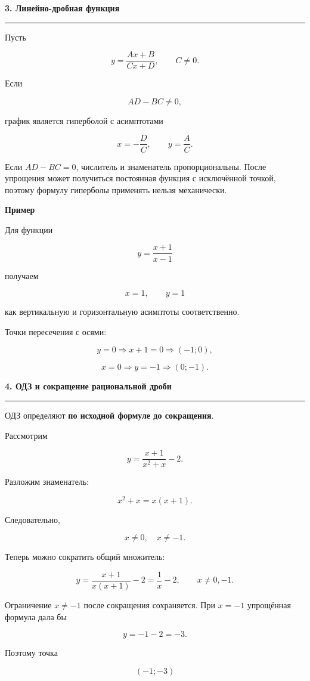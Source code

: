 \documentclass[a4paper,12pt]{article}
\newcommand{\sectiontitle}[1]{%
    \par\vspace{0.65em}
    {\Large\bfseries\color{darkaccent}#1}\par
    \vspace{0.15em}
    {\color{accent}\rule{\linewidth}{0.65pt}}\par
    \vspace{0.3em}
}
\newcommand{\subsectiontitle}[1]{%
    \par\vspace{0.45em}
    {\large\bfseries\color{darkaccent}#1}\par
    \vspace{0.1em}
}
\begin{document}
\sectiontitle{3. Линейно-дробная функция}

Пусть

\[
y=\frac{Ax+B}{Cx+D},
\qquad C\ne0.
\]

Если

\[
AD-BC\ne0,
\]

график является гиперболой с асимптотами

\[
\boxed{x=-\frac{D}{C}},
\qquad
\boxed{y=\frac{A}{C}}.
\]

Если \(AD-BC=0\), числитель и знаменатель пропорциональны. После упрощения
может получиться постоянная функция с исключённой точкой, поэтому формулу
гиперболы применять нельзя механически.

\subsectiontitle{Пример}

Для функции

\[
y=\frac{x+1}{x-1}
\]

получаем

\[
x=1,
\qquad
y=1
\]

как вертикальную и горизонтальную асимптоты соответственно.

Точки пересечения с осями:

\[
y=0
\Longrightarrow
x+1=0
\Longrightarrow
\boxed{(-1;0)},
\]

\[
x=0
\Longrightarrow
y=-1
\Longrightarrow
\boxed{(0;-1)}.
\]

\sectiontitle{4. ОДЗ и сокращение рациональной дроби}

ОДЗ определяют \textbf{по исходной формуле до сокращения}.

Рассмотрим

\[
y=\frac{x+1}{x^2+x}-2.
\]

Разложим знаменатель:

\[
x^2+x=x(x+1).
\]

Следовательно,

\[
\boxed{x\ne0,\quad x\ne-1}.
\]

Теперь можно сократить общий множитель:

\[
y=
\frac{x+1}{x(x+1)}-2
=
\frac1x-2,
\qquad x\ne0,-1.
\]

Ограничение \(x\ne-1\) после сокращения сохраняется. При \(x=-1\)
упрощённая формула дала бы

\[
y=-1-2=-3.
\]

Поэтому точка

\[
\boxed{(-1;-3)}
\]
\end{document}
